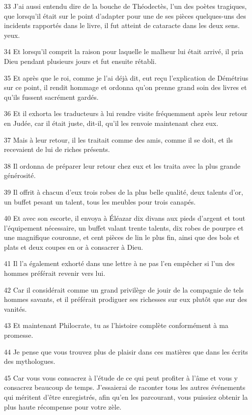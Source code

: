 \par 33 J'ai aussi entendu dire de la bouche de Théodectès, l'un des poètes tragiques, que lorsqu'il était sur le point d'adapter pour une de ses pièces quelques-uns des incidents rapportés dans le livre, il fut atteint de cataracte dans les deux sens. yeux.

\par 34 Et lorsqu'il comprit la raison pour laquelle le malheur lui était arrivé, il pria Dieu pendant plusieurs jours et fut ensuite rétabli.

\par 35 Et après que le roi, comme je l'ai déjà dit, eut reçu l'explication de Démétrius sur ce point, il rendit hommage et ordonna qu'on prenne grand soin des livres et qu'ils fussent sacrément gardés.

\par 36 Et il exhorta les traducteurs à lui rendre visite fréquemment après leur retour en Judée, car il était juste, dit-il, qu'il les renvoie maintenant chez eux.

\par 37 Mais à leur retour, il les traitait comme des amis, comme il se doit, et ils recevaient de lui de riches présents.

\par 38 Il ordonna de préparer leur retour chez eux et les traita avec la plus grande générosité.

\par 39 Il offrit à chacun d'eux trois robes de la plus belle qualité, deux talents d'or, un buffet pesant un talent, tous les meubles pour trois canapés.

\par 40 Et avec son escorte, il envoya à Éléazar dix divans aux pieds d'argent et tout l'équipement nécessaire, un buffet valant trente talents, dix robes de pourpre et une magnifique couronne, et cent pièces de lin le plus fin, ainsi que des bols et plats et deux coupes en or à consacrer à Dieu.

\par 41 Il l'a également exhorté dans une lettre à ne pas l'en empêcher si l'un des hommes préférait revenir vers lui.

\par 42 Car il considérait comme un grand privilège de jouir de la compagnie de tels hommes savants, et il préférait prodiguer ses richesses sur eux plutôt que sur des vanités.

\par 43 Et maintenant Philocrate, tu as l'histoire complète conformément à ma promesse.

\par 44 Je pense que vous trouvez plus de plaisir dans ces matières que dans les écrits des mythologues.

\par 45 Car vous vous consacrez à l'étude de ce qui peut profiter à l'âme et vous y consacrez beaucoup de temps. J'essaierai de raconter tous les autres événements qui méritent d'être enregistrés, afin qu'en les parcourant, vous puissiez obtenir la plus haute récompense pour votre zèle.


